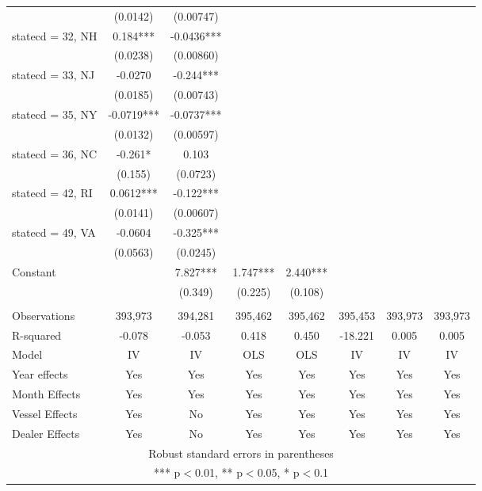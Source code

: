 \begin{tabular}{lccccccc}
 & (0.0142) & (0.00747) &  &  &  &  &  \\
statecd = 32, NH & 0.184*** & -0.0436*** &  &  &  &  &  \\
 & (0.0238) & (0.00860) &  &  &  &  &  \\
statecd = 33, NJ & -0.0270 & -0.244*** &  &  &  &  &  \\
 & (0.0185) & (0.00743) &  &  &  &  &  \\
statecd = 35, NY & -0.0719*** & -0.0737*** &  &  &  &  &  \\
 & (0.0132) & (0.00597) &  &  &  &  &  \\
statecd = 36, NC & -0.261* & 0.103 &  &  &  &  &  \\
 & (0.155) & (0.0723) &  &  &  &  &  \\
statecd = 42, RI & 0.0612*** & -0.122*** &  &  &  &  &  \\
 & (0.0141) & (0.00607) &  &  &  &  &  \\
statecd = 49, VA & -0.0604 & -0.325*** &  &  &  &  &  \\
 & (0.0563) & (0.0245) &  &  &  &  &  \\
Constant &  & 7.827*** & 1.747*** & 2.440*** &  &  &  \\
 &  & (0.349) & (0.225) & (0.108) &  &  &  \\
 &  &  &  &  &  &  &  \\
Observations & 393,973 & 394,281 & 395,462 & 395,462 & 395,453 & 393,973 & 393,973 \\
R-squared & -0.078 & -0.053 & 0.418 & 0.450 & -18.221 & 0.005 & 0.005 \\
Model & IV & IV & OLS & OLS & IV & IV & IV \\
Year effects & Yes & Yes & Yes & Yes & Yes & Yes & Yes \\
Month Effects & Yes & Yes & Yes & Yes & Yes & Yes & Yes \\
Vessel Effects & Yes & No & Yes & Yes & Yes & Yes & Yes \\
 Dealer Effects & Yes & No & Yes & Yes & Yes & Yes & Yes \\ \hline
\multicolumn{8}{c}{ Robust standard errors in parentheses} \\
\multicolumn{8}{c}{ *** p$<$0.01, ** p$<$0.05, * p$<$0.1} \\
\end{tabular}
